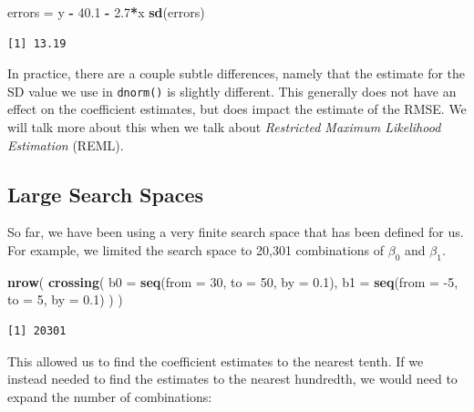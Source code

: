 \documentclass[]{book}
\newenvironment{Shaded}{\begin{snugshade}}{\end{snugshade}}
\newcommand{\DataTypeTok}[1]{\textcolor[rgb]{0.13,0.29,0.53}{#1}}
\newcommand{\DecValTok}[1]{\textcolor[rgb]{0.00,0.00,0.81}{#1}}
\newcommand{\FloatTok}[1]{\textcolor[rgb]{0.00,0.00,0.81}{#1}}
\newcommand{\KeywordTok}[1]{\textcolor[rgb]{0.13,0.29,0.53}{\textbf{#1}}}
\newcommand{\NormalTok}[1]{#1}
\newcommand{\OperatorTok}[1]{\textcolor[rgb]{0.81,0.36,0.00}{\textbf{#1}}}
\newcommand{\StringTok}[1]{\textcolor[rgb]{0.31,0.60,0.02}{#1}}
\begin{document}
\begin{Shaded}
\begin{Highlighting}[]
\NormalTok{errors =}\StringTok{ }\NormalTok{y }\OperatorTok{-}\StringTok{ }\FloatTok{40.1} \OperatorTok{-}\StringTok{ }\FloatTok{2.7}\OperatorTok{*}\NormalTok{x}
\KeywordTok{sd}\NormalTok{(errors)}
\end{Highlighting}
\end{Shaded}

\begin{verbatim}
[1] 13.19
\end{verbatim}

In practice, there are a couple subtle differences, namely that the estimate for the SD value we use in \texttt{dnorm()} is slightly different. This generally does not have an effect on the coefficient estimates, but does impact the estimate of the RMSE. We will talk more about this when we talk about \emph{Restricted Maximum Likelihood Estimation} (REML).

\hypertarget{large-search-spaces}{%
\subsection{Large Search Spaces}\label{large-search-spaces}}

So far, we have been using a very finite search space that has been defined for us. For example, we limited the search space to 20,301 combinations of \(\beta_0\) and \(\beta_1\).

\begin{Shaded}
\begin{Highlighting}[]
\KeywordTok{nrow}\NormalTok{(}
  \KeywordTok{crossing}\NormalTok{(}
    \DataTypeTok{b0 =} \KeywordTok{seq}\NormalTok{(}\DataTypeTok{from =} \DecValTok{30}\NormalTok{, }\DataTypeTok{to =} \DecValTok{50}\NormalTok{, }\DataTypeTok{by =} \FloatTok{0.1}\NormalTok{),}
    \DataTypeTok{b1 =} \KeywordTok{seq}\NormalTok{(}\DataTypeTok{from =} \DecValTok{-5}\NormalTok{, }\DataTypeTok{to =} \DecValTok{5}\NormalTok{, }\DataTypeTok{by =} \FloatTok{0.1}\NormalTok{)}
\NormalTok{  )}
\NormalTok{)}
\end{Highlighting}
\end{Shaded}

\begin{verbatim}
[1] 20301
\end{verbatim}

This allowed us to find the coefficient estimates to the nearest tenth. If we instead needed to find the estimates to the nearest hundredth, we would need to expand the number of combinations:
\end{document}
